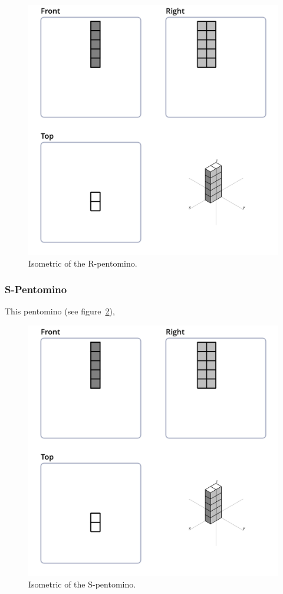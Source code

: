 \begin{figure}
	\centering
	\includegraphics[scale=0.3]{iso_diagrams/o.png}
	\caption{Isometric of the R-pentomino.}
  \label{fig:iso-pent-r}
\end{figure}

\subsubsection{S-Pentomino}
This pentomino (see figure~\ref{fig:iso-pent-s}),


\begin{figure}
	\centering
	\includegraphics[scale=0.3]{iso_diagrams/o.png}
	\caption{Isometric of the S-pentomino.}
  \label{fig:iso-pent-s}
\end{figure}

